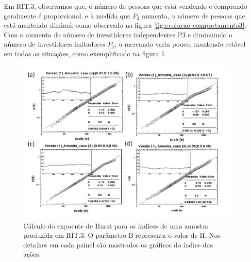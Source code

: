 \documentclass[brazil,ruledheader]{abnt}
\begin{document}
Em RIT.3, observamos que, o número de pessoas que está vendendo e comprando
geralmente é proporcional, e à medida que $P_2$ aumenta, o número de pessoas que
está mantendo diminui, como observado na
figura \ref{fig:evolucao-comportamento3}.  Com o aumento do número de
investidores independentes P3 e diminuindo o número de investidores imitadores
$P_1$, o mercando varia pouco, mantendo estável em todas as situações, como
exemplificado na figura \ref{fig:calculo-expoente-hurst4}.

\begin{figure}[!h]
\centering
\includegraphics[width=0.8\linewidth]{Figuras/10.jpg}
\caption[ Cálculo do expoente de Hurst para os índices em RIT.3] {Cálculo do
expoente de Hurst para os índices de uma amostra produzida em RIT.3.  O
parâmetro B representa o valor de H. Nos detalhes em cada painel são mostrados
os gráficos do índice das ações. }
\label{fig:calculo-expoente-hurst4}
\end{figure}
\end{document}
